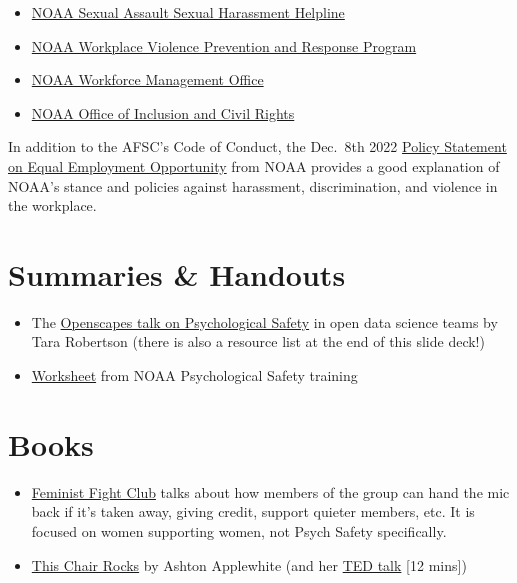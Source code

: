 \documentclass[
  letterpaper,
  DIV=11,
  numbers=noendperiod]{scrreprt}
\providecommand{\tightlist}{%
  \setlength{\itemsep}{0pt}\setlength{\parskip}{0pt}}\usepackage{longtable,booktabs,array}
\begin{document}
\begin{itemize}
\tightlist
\item
  \href{https://noaasashhelpline.org/}{NOAA Sexual Assault Sexual
  Harassment Helpline}
\item
  \href{https://www.noaa.gov/workplace-violence-prevention-response-program}{NOAA
  Workplace Violence Prevention and Response Program}
\item
  \href{mailto:DAO-955.OHCS@noaa.gov}{NOAA Workforce Management Office}
\item
  \href{mailto:noaa.oicr@noaa.gov}{NOAA Office of Inclusion and Civil
  Rights}
\end{itemize}

In addition to the AFSC's Code of Conduct, the Dec.~8th 2022
\href{https://www.noaa.gov/organization/inclusion-and-civil-rights/policy-statement-on-equal-employment-opportunity}{Policy
Statement on Equal Employment Opportunity} from NOAA provides a good
explanation of NOAA's stance and policies against harassment,
discrimination, and violence in the workplace.

\section{Summaries \& Handouts}\label{summaries-handouts}

\begin{itemize}
\tightlist
\item
  The
  \href{https://docs.google.com/presentation/d/1TwCyf9xicLWBfPhW9HnYQH3-mHycEyVKTm38zSg4D3Q/edit?usp=sharing}{Openscapes
  talk on Psychological Safety} in open data science teams by Tara
  Robertson (there is also a resource list at the end of this slide
  deck!)\\
\item
  \href{https://drive.google.com/file/d/1kY4otiCfyGXMHPtWxuSMndHsAbc5FcrY/view?usp=sharing}{Worksheet}
  from NOAA Psychological Safety training
\end{itemize}

\section{Books}\label{books}

\begin{itemize}
\item
  \href{https://bookshop.org/p/books/feminist-fight-club-a-survival-manual-for-a-sexist-workplace-jessica-bennett/6437314?ean=9780062689030}{Feminist
  Fight Club} talks about how members of the group can hand the mic back
  if it's taken away, giving credit, support quieter members, etc. It is
  focused on women supporting women, not Psych Safety specifically.
\item
  \href{https://bookshop.org/p/books/this-chair-rocks-a-manifesto-against-ageism-ashton-applewhite/6986118?ean=9781250297259}{This
  Chair Rocks} by Ashton Applewhite (and her
  \href{https://www.ted.com/talks/ashton_applewhite_let_s_end_ageism}{TED
  talk} {[}12 mins{]})
\end{itemize}
\end{document}
